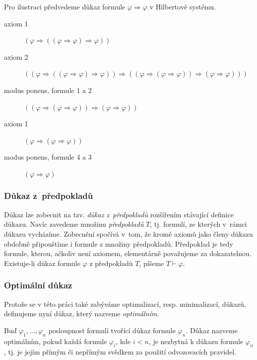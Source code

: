 \documentclass[thesis=B,czech,hidelinks]{thesis}[2012/06/26]
\begin{document}
\begin{exm}
\label{exm:proof_a>a}
Pro ilustraci předvedeme důkaz formule $\varphi \Rightarrow \varphi$ v Hilbertově systému.
\begin{description}
	\item[axiom 1] $(\varphi \Rightarrow ((\varphi \Rightarrow \varphi) \Rightarrow \varphi))$
	\item[axiom 2] $((\varphi \Rightarrow ((\varphi \Rightarrow \varphi) \Rightarrow \varphi)) \Rightarrow ((\varphi \Rightarrow (\varphi \Rightarrow \varphi)) \Rightarrow (\varphi \Rightarrow \varphi)))$
	\item[modus ponens, formule 1 a 2] $((\varphi \Rightarrow (\varphi \Rightarrow \varphi)) \Rightarrow (\varphi \Rightarrow \varphi))$
	\item[axiom 1] $(\varphi \Rightarrow (\varphi \Rightarrow \varphi))$
	\item[modus ponens, formule 4 a 3] $(\varphi \Rightarrow \varphi)$
\end{description}
\end{exm}

\subsubsection{Důkaz z~předpokladů}
\label{sec:proof_theory}

Důkaz lze zobecnit na tzv. \emph{důkaz z~předpokladů} rozšířením stávající definice důkazu. Navíc zavedeme množinu \emph{předpokladů} $T$, tj. formulí, ze kterých v~rámci důkazu vycházíme. Zobecnění spočívá v~tom, že kromě axiomů jako členy důkazu obdobně připouštíme i formule z množiny předpokladů. Předpoklad je tedy formule, kterou, ačkoliv není axiomem, elementárně považujeme za dokazatelnou. Existuje-li důkaz formule $\varphi$ z předpokladů $T$, píšeme $T \vdash \varphi$.

\subsubsection{Optimální důkaz}

Protože se v této práci také zabýváme optimalizací, resp. minimalizací, důkazů, definujeme nyní důkaz, který nazveme \emph{optimálním}.

\begin{dfn}
\label{dfn:optimal_proof}
Buď $\varphi_1, \ldots, \varphi_n$ posloupnost formulí tvořící důkaz formule $\varphi_n$. Důkaz nazveme optimálním, pokud každá formule $\varphi_i$, kde $i < n$, je nezbytná k důkazu formule $\varphi_n$, tj. je jejím přímým či nepřímým svědkem za použití odvozovacích pravidel.
\end{dfn}
\end{document}
